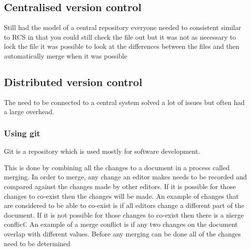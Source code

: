 % 

\subsection{Centralised version control}
Still had the model of a central repository everyone needed to consistent
similar to RCS in that you could still check the file out but it was not as necessary to lock the file
it was possible to look at the differences between the files and then automatically merge when it was possible

\subsection{Distributed version control}
The need to be connected to a central system solved a lot of issues but often had a large overhead.  



\subsubsection{Using git}
Git is a repository which is used mostly for software development.

This is done by combining all the changes to a document in a process called merging. 
In order to merge, any change an editor makes needs to be recorded and compared against the changes made by other editors.
If it is possible for those changes to co-exist then the changes will be made.
An example of changes that are considered to be able to co-exist is if all editors change a different part of the document.
If it is not possible for those changes to co-exist then there is a \"merge conflict\".
An example of a merge conflict is if any two changes on the document overlap with different values.
Before any merging can be done all of the changes need to be determined


